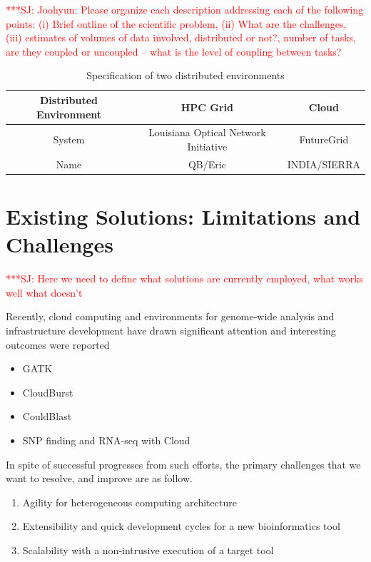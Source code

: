 \documentclass[12pt]{article}
\newcommand{\jhanote}[1]{ {\textcolor{red}     {***SJ: #1}}}
\newcommand{\jhanote}[1]{}
\begin{document}
\jhanote{Joohyun: Please organize each description addressing each of
  the following points: (i) Brief outline of the scientific problem,
  (ii) What are the challenges, (iii) estimates of volumes of data
  involved, distributed or not?, number of tasks, are they coupled or
  uncoupled -- what is the level of coupling between tasks?}


 \begin{table}
 \begin{tabular}{|c|cc|} 
 \hline 
Distributed Environment &  HPC Grid &  Cloud \\ \hline
System  &  Louisiana Optical Network Initiative & FutureGrid \\
Name &  QB/Eric   &  INDIA/SIERRA \\
 \hline
 \end{tabular}
\caption{Specification of two distributed environments}
\label{table:two-systems} 
\end{table}
 
 
\section{Existing Solutions: Limitations and Challenges}

\jhanote{Here we need to define what solutions are currently employed, what works well
  what doesn't}

Recently, cloud computing and environments for genome-wide analysis and infrastructure development have drawn significant attention and interesting outcomes were reported\cite{taylor2010,cloudburst, cloudblast, langmead2009, langmead2010,gatk, halligan2009}

\begin{itemize}
\item GATK\cite{gatk}
\item CloudBurst\cite{cloudburst}
\item CouldBlast\cite{cloudblast}
\item SNP finding and RNA-seq with Cloud\cite{langmead2009, langmead2010}
\end{itemize}

In spite of successful progresses from such efforts, the primary challenges that we want to resolve, and improve are as follow.

\begin{enumerate}
\item Agility for heterogeneous computing architecture
\item Extensibility and quick development cycles for a new bioinformatics tool
\item Scalability with a non-intrusive execution of a target tool  
\end{enumerate}
\end{document}
